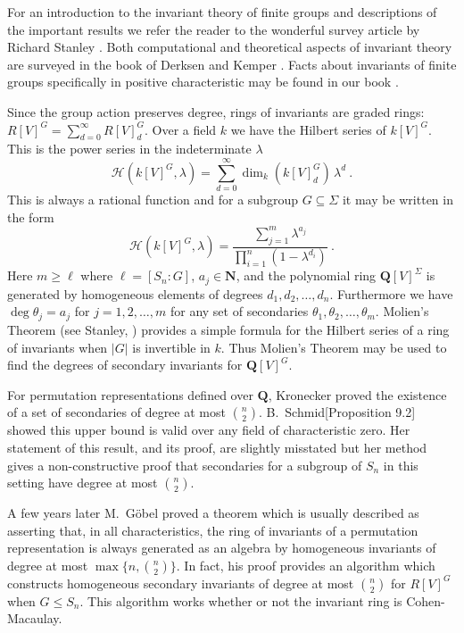 \documentclass[12pt]{amsart}
\providecommand{\binom}[2]{{#1\choose#2}}
\renewcommand{\geq}{\geqslant}
\renewcommand{\leq}{\leqslant}
\newcommand{\NN}{\mathbf{N}} %
\newcommand{\QQ}{\mathbf{Q}} %
\newcommand{\NN}{\mathbb{N}} %
\newcommand{\QQ}{\mathbb{Q}} %
\newcommand{\Sn}{{S_n}}
\theoremstyle{definition}
\newcommand{\calh}{\mathcal{H}}
\begin{document}
For an introduction to the invariant theory of finite groups and descriptions of the important results we refer the reader to the wonderful survey article by Richard Stanley \cite{bible}.  Both computational and theoretical aspects of invariant theory are surveyed in the book of Derksen and Kemper \cite{D-K}.  Facts about invariants of finite groups specifically in positive characteristic may be found in our book \cite{C-W}.

Since the group action preserves degree, rings of invariants are graded rings:
$R[V]^G = \sum_{d=0}^\infty R[V]^G_d$.  Over a field $k$ we have   
the Hilbert series of $k[V]^G$.  This is the power series in the indeterminate $\lambda$ 
$$\calh(k[V]^G,\lambda) =
\sum_{d=0}^\infty \dim_{k} (k[V]^G_d)\, \lambda^d\ .$$  This is always a 
rational function and for a subgroup $G \subseteq \Sigma$ it may be written in the  
form 
$$\calh(k[V]^G,\lambda)
=\frac{\sum_{j=1}^m \lambda^{a_j}}{\prod_{i=1}^n(1-\lambda^{d_i})}\ .$$  Here $m \geq \ell$ where $\ell=[\Sn:G]$, $a_j \in \NN$, and the polynomial ring $\QQ[V]^\Sigma$ is generated by homogeneous elements of degrees $d_1,d_2,\dots,d_n$.  Furthermore we have $\deg \theta_j = a_j$ for $j=1,2,\dots,m$ for any set of secondaries $\theta_1,\theta_2,\dots,\theta_m$. Molien's Theorem (see Stanley, \cite[Theorem 2.1]{bible}) provides a simple formula for the Hilbert series of a ring of invariants when $|G|$ is invertible in $k$. Thus Molien's Theorem may be used to find  the degrees of secondary invariants for $\QQ[V]^G$.

For permutation representations defined over $\QQ$, Kronecker\cite{K} proved 
the existence of a set of secondaries of degree at most $\binom{n}{2}$.
B.~Schmid[Proposition 9.2]\cite{Schmid} showed this upper 
bound is valid over any field of characteristic zero.  
Her statement of this result, and its proof, are slightly misstated but 
her method gives a non-constructive proof that secondaries for a subgroup of $\Sn$ in this setting
have degree at most $\binom{n}{2}$.

A few years later
M.~G\"obel proved a theorem \cite[Theorem 3.11]{Gobel} which is usually described as asserting that,
in all characteristics, the ring of invariants of a 
permutation representation
is always generated as an algebra by homogeneous invariants of degree at most $\max\{n,\binom{n}{2}\}$.  In fact, his proof provides an algorithm which 
constructs homogeneous secondary invariants of degree at most $\binom{n}{2}$ for $R[V]^G$ when 
$G \leq \Sn$.  This algorithm works whether or not the invariant ring is Cohen-Macaulay. 
\end{document}

